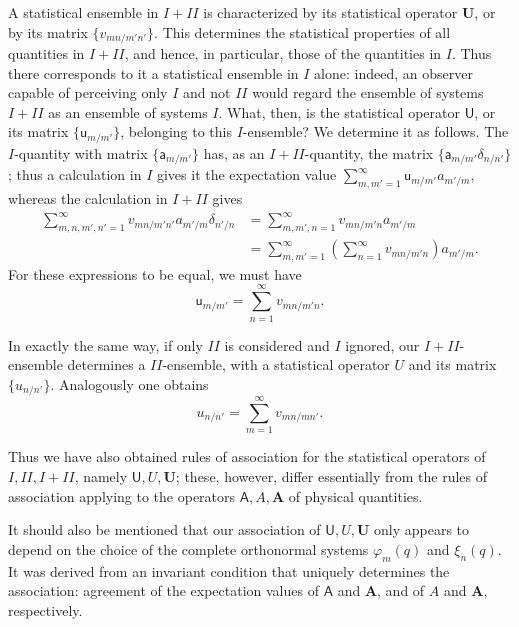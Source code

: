 \documentclass[fontsize=13pt,twoside,openany,headings=normal,parskip=false,bookmarkpackage=false,DIV=calc]{scrbook}
\begin{document}
A statistical ensemble in $I+II$ is characterized by its statistical operator $\boldsymbol U$, or by its matrix $\{v_{mn/m'n'}\}$. This determines the statistical properties of all quantities in $I+II$, and hence, in particular, those of the quantities in $I$. Thus there corresponds to it a statistical ensemble in $I$ alone: indeed, an observer capable of perceiving only $I$ and not $II$ would regard the ensemble of systems $I+II$ as an ensemble of systems $I$. What, then, is the statistical operator $\mathsf U$, or its matrix $\{\mathsf u_{m/m'}\}$, belonging to this $I$-ensemble? We determine it as follows. The $I$-quantity with matrix $\{\mathsf a_{m/m'}\}$ has, as an $I+II$-quantity, the matrix $\{\mathsf a_{m/m'}\delta_{n/n'}\}$; thus a calculation in $I$ gives it the expectation value $\sum_{m,m'=1}^{\infty}\mathsf u_{m/m'}a_{m'/m}$, whereas the calculation in $I+II$ gives
\begin{align*}
 \sum_{m,n,m',n'=1}^{\infty}v_{mn/m'n'}a_{m'/m}\delta_{n'/n}
 &=\sum_{m,m',n=1}^{\infty}v_{mn/m'n}a_{m'/m}\\
 &=\sum_{m,m'=1}^{\infty}\left(\sum_{n=1}^{\infty}v_{mn/m'n}\right)a_{m'/m}.
\end{align*}
For these expressions to be equal, we must have
\[
 \mathsf u_{m/m'}=\sum_{n=1}^{\infty}v_{mn/m'n}.
\]

In exactly the same way, if only $II$ is considered and $I$ ignored, our $I+II$-ensemble determines a $II$-ensemble, with a statistical operator $U$ and its matrix $\{u_{n/n'}\}$. Analogously one obtains
\[
 u_{n/n'}=\sum_{m=1}^{\infty}v_{mn/mn'}.
\]

Thus we have also obtained rules of association for the statistical operators of $I,II,I+II$, namely $\mathsf U,U,\boldsymbol U$; these, however, differ essentially from the rules of association applying to the operators $\mathsf A,A,\boldsymbol A$ of physical quantities.
\hypertarget{origpage-227}{}%

It should also be mentioned that our association of $\mathsf U,U,\boldsymbol U$ only appears to depend on the choice of the complete orthonormal systems $\varphi_m(q)$ and $\xi_n(q)$. It was derived from an invariant condition that uniquely determines the association: agreement of the expectation values of $\mathsf A$ and $\boldsymbol A$, and of $A$ and $\boldsymbol A$, respectively.
\end{document}
